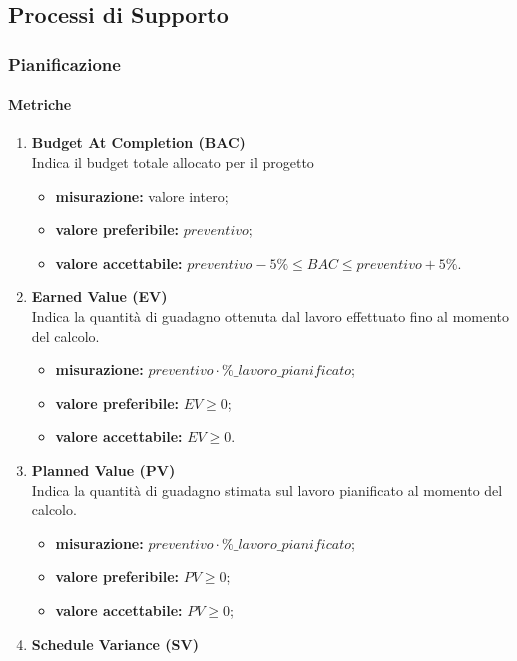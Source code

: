\subsection{Processi di Supporto}
	\subsubsection{Pianificazione}
		\paragraph{Metriche}
		\begin{enumerate}
		\item[]
			\textbf{Budget At Completion (BAC)}\\
			Indica il budget totale allocato per il progetto
			\begin{itemize}
				\item \textbf{misurazione:} valore intero;
				\item \textbf{valore preferibile:} $preventivo$;
				\item \textbf{valore accettabile:} $preventivo-5\%\leq BAC\leq preventivo+5\%$.
			\end{itemize}
		\item[]
			\textbf{Earned Value (EV)}\\
			Indica la quantità di guadagno ottenuta dal lavoro effettuato fino al momento del calcolo.
			\begin{itemize}
				\item \textbf{misurazione:} $preventivo\cdot \%\_lavoro\_pianificato$;
				\item \textbf{valore preferibile:} $EV\geq 0$;
				\item \textbf{valore accettabile:} $EV\geq 0$.
			\end{itemize}
		\item[]
			\textbf{Planned Value (PV)}\\
			Indica la quantità di guadagno stimata sul lavoro pianificato al momento del calcolo.
			\begin{itemize}
				\item \textbf{misurazione:} $preventivo \cdot \%\_lavoro\_pianificato$;
				\item \textbf{valore preferibile:} $PV\geq 0$;
				\item \textbf{valore accettabile:} $PV\geq 0$;
			\end{itemize}
		\item[]
			\textbf{Schedule Variance (SV)}\\

\end{enumerate}
